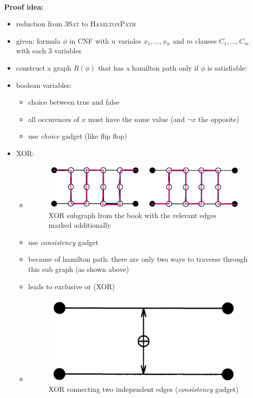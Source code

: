 \documentclass[a4]{scrartcl}
\begin{document}
\ \\
\textbf{Proof idea:}
\begin{itemize}
\item reduction from \textsc{3Sat} to \textsc{HamiltonPath}
\item given: formula $\phi$ in CNF with $n$ variales $x_1,...,x_n$ and $m$ clauses $C_1,...,C_m$ with each 3 variables
\item construct a graph $R(\phi)$ that has a hamilton path only if $\phi$ is satisfiable:

\item boolean variables:

\begin{itemize}
\item choice between true and false
\item all occurences of $x$ must have the same value (and $\neg x$ the opposite)
\item use \textit{choice} gadget (like flip flop)
\end{itemize}

\item XOR:

\begin{itemize}
\item[]
\begin{figure}[H]
\begin{center}
\includegraphics[scale=0.5]{xor.jpg}
\end{center}
\caption{XOR subgraph from the book \cite{book} with the relevant edges marked additionally}
\end{figure}
\item use \textit{consistency} gadget
\item because of hamilton path: there are only two ways to traverse through this sub graph (as shown above)
\item leads to exclusive or (XOR)
\item[]
\begin{figure}[H]
\begin{center}
\includegraphics[scale=0.3]{xor2.jpg}
\end{center}
\caption{XOR connecting two independent edges (\textit{consistency} gadget) \cite{book}}
\end{figure}
\end{itemize}


\end{itemize}
\end{document}
